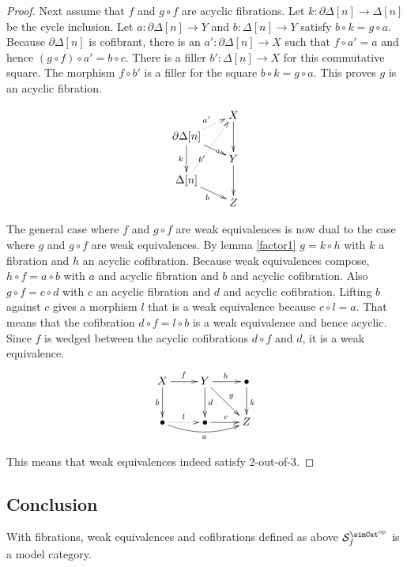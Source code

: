 \documentclass{tac}
\newcommand\hide[1]{}
\newcommand\cat\mathcal
\newcommand\dual{^{\mathrm{op}}}
\newcommand\s{^{\simCat\dual}}
\newcommand\of{:}
\newcommand\simplex\Delta
\newcommand\cycle{\partial\Delta}
\newcommand\f{_f}
\begin{document}
\begin{proof}
Next assume that $f$ and $g\circ f$ are acyclic fibrations. Let $k\of\cycle[n]\to\simplex[n]$ be the cycle inclusion. Let $a\of\cycle[n]\to Y$ and $b\of\simplex[n]\to Y$ satisfy $b\circ k = g \circ a$. Because $\cycle[n]$ is cofibrant, there is an $a'\of \cycle[n]\to X$ such that $f\circ a' = a$ and hence $(g\circ f)\circ a' = b\circ c$. There is a filler $b'\of\simplex[n]\to X$ for this commutative square. The morphism $f\circ b'$ is a filler for the square $b\circ k = g \circ a$. This proves $g$ is an acyclic fibration.

\[\xy
(14\halfrootthree,28)*+{X}="x", (0,21)*+{\cycle[n]}="v", (14\halfrootthree,14)*+{Y}="y", (0,7)*+{\simplex[n]}="w", (14\halfrootthree,0)*+{Z}="z"
\ar@{.>}^{a'} "v";"x" \ar|(.67)a "v";"y" \ar_k "v";"w"
\ar@{.>}|(.33){b'} "w";"x" \ar_b "w";"z"
\ar "x";"y" \ar "y";"z"
\endxy\]

The general case where $f$ and $g\circ f$ are weak equivalences is now dual to the case where $g$ and $g\circ f$ are weak equivalences. By lemma \ref{factor1} $g=k\circ h$ with $k$ a fibration and $h$ an acyclic cofibration. Because weak equivalences compose, $h\circ f = a\circ b$ with $a$ and acyclic fibration and $b$ and acyclic cofibration. 
Also $g\circ f = c\circ d$ with $c$ an acyclic fibration and $d$ and acyclic cofibration. 
Lifting $b$ against $c$ gives a morphism $l$ that is a weak equivalence because $c\circ l = a$. That means that the cofibration $d\circ f = l\circ b$ is a weak equivalence and hence acyclic. Since $f$ is wedged between the acyclic cofibrations $d\circ f$ and $d$, it is a weak equivalence. 
\[\xymatrix{
X\ar[r]^f\ar[d]_b & Y\ar[r]^h\ar[d]^d\ar[dr]^g & \bullet\ar[d]^k\\
\bullet\ar@/_2ex/[rr]_a\ar@{.>}[r]^l & \bullet\ar[r]^c & Z
}\]%

This means that weak equivalences indeed satisfy 2-out-of-3.
\end{proof}

\hide{Use the structure of discrete isofibration etc. to make this more convincing?}

\subsection{Conclusion}

\begin{theorem}
With fibrations, weak equivalences and cofibrations defined as above $\cat S\s\f$ is a model category.
\label{model category}
\end{theorem}
\end{document}
